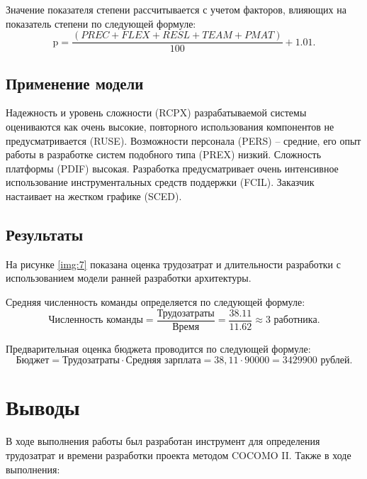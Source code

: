 Значение показателя степени рассчитывается с учетом факторов, влияющих на показатель степени по следующей формуле:
\begin{equation}
    \text{p} = \frac{(PREC + FLEX + RESL + TEAM + PMAT)}{100} + 1.01.
\end{equation}


\subsection{Применение модели}

Надежность и уровень сложности (RCPX) разрабатываемой системы оцениваются как очень высокие, повторного использования компонентов не предусматривается (RUSE). 
Возможности персонала (PERS) -- средние, его опыт работы в разработке систем подобного типа (PREX) низкий. 
Сложность платформы (PDIF) высокая. 
Разработка предусматривает очень интенсивное использование инструментальных средств поддержки (FCIL). 
Заказчик настаивает на жестком графике (SCED).

\subsection{Результаты}

На рисунке \ref{img:7} показана оценка трудозатрат и длительности разработки с использованием модели ранней разработки архитектуры.


Средняя численность команды определяется по следующей формуле:
\begin{equation}
    \text{Численность команды} = \frac{\text{Трудозатраты}}{\text{Время}} = \frac{38.11}{11.62} \approx 3 \text{ работника}.
\end{equation}

Предварительная оценка бюджета проводится по следующей формуле:
\begin{equation}
    \text{Бюджет} = \text{Трудозатраты} \cdot \text{Средняя зарплата} = 38{,}11 \cdot 90000 = 3429900 \text{ рублей}.
\end{equation}


\clearpage
\section{Выводы}

В ходе выполнения работы был разработан инструмент для определения трудозатрат и времени разработки проекта методом COCOMO II. Также в ходе выполнения:


